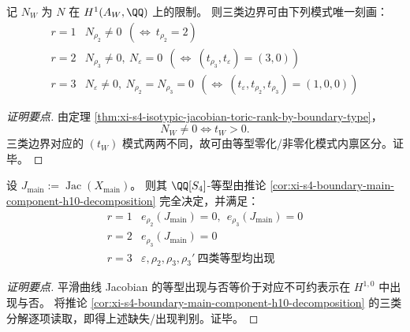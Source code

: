 \begin{corollary}[三类边界的等型零化模式内禀判别]\label{cor:xi-s4-boundary-type-intrinsic-by-isotypic-nilpotent-pattern}
记 \(N_W\) 为 \(N\) 在 \(H^1(A_W,\QQ)\) 上的限制。
则三类边界可由下列模式唯一刻画：
\[
\begin{array}{c|l}
r=1 & N_{\rho_2}\neq 0\ \ (\Leftrightarrow\ t_{\rho_2}=2)\\
\hline
r=2 & N_{\rho_3}\neq 0,\ N_{\varepsilon}=0\ \ (\Leftrightarrow\ (t_{\rho_3},t_{\varepsilon})=(3,0))\\
\hline
r=3 & N_{\varepsilon}\neq 0,\ N_{\rho_2}=N_{\rho_3}=0\ \ (\Leftrightarrow\ (t_{\varepsilon},t_{\rho_2},t_{\rho_3})=(1,0,0))
\end{array}
\]
\end{corollary}
\begin{proof}[证明要点]
由定理 \ref{thm:xi-s4-isotypic-jacobian-toric-rank-by-boundary-type}，
\[
N_W\neq 0\iff t_W>0.
\]
三类边界对应的 \((t_W)\) 模式两两不同，故可由等型零化/非零化模式内禀区分。证毕。
\end{proof}

\begin{theorem}\label{thm:xi-s4-main-component-jacobian-isotypic-missing-pattern}
设 \(J_{\mathrm{main}}:=\operatorname{Jac}(X_{\mathrm{main}})\)。
则其 \(\QQ[S_4]\)-等型由推论 \ref{cor:xi-s4-boundary-main-component-h10-decomposition} 完全决定，并满足：
\[
\begin{array}{c|l}
r=1 & e_{\rho_2}(J_{\mathrm{main}})=0,\ \ e_{\rho_3}(J_{\mathrm{main}})=0\\
\hline
r=2 & e_{\rho_3}(J_{\mathrm{main}})=0\\
\hline
r=3 & \varepsilon,\rho_2,\rho_3,\rho_3'\ \text{四类等型均出现}
\end{array}
\]
\end{theorem}
\begin{proof}[证明要点]
平滑曲线 Jacobian 的等型出现与否等价于对应不可约表示在 \(H^{1,0}\) 中出现与否。
将推论 \ref{cor:xi-s4-boundary-main-component-h10-decomposition} 的三类分解逐项读取，即得上述缺失/出现判别。证毕。
\end{proof}

